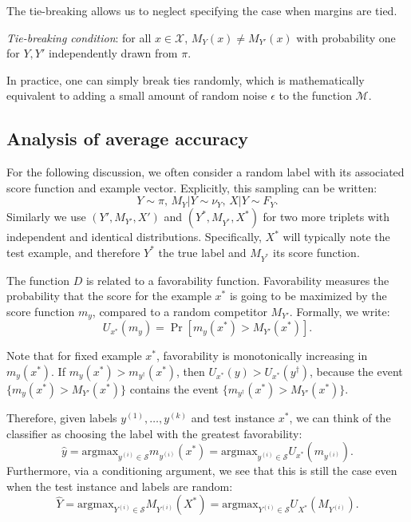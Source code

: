 \documentclass[twoside,11pt]{article}
\newcommand{\argmax}{\text{argmax}}
\begin{document}
The tie-breaking allows us
to neglect specifying the case when
margins are tied.
\begin{definition}
\emph{Tie-breaking condition}: for all $x \in \mathcal{X}$,
$M_Y(x) \neq M_{Y'}(x)$
with probability one for $Y, Y'$ independently drawn from $\pi$.
\end{definition}
In practice, one can simply break ties randomly,
which is mathematically equivalent to adding a small amount of random
noise $\epsilon$ to the function $\mathcal{M}$.

\subsection{Analysis of average accuracy}

For the following discussion, we often consider a random label with
its associated score function and example vector. Explicitly, this
sampling can be written:
\[Y \sim \pi,\, M_{Y}|Y \sim \nu_{Y},\, X|Y \sim F_{Y}. \]
Similarly we use $(Y',M_{Y'},X')$ and $(Y^*,M_{Y^*},X^*)$ for two more
triplets with independent and identical distributions. Specifically,
$X^*$ will typically note the test example, and therefore $Y^*$ the
true label and $M_{Y^*}$ its score function.

The function ${D}$ is related to a favorability
function. Favorability measures the probability that the score for the
example $x^*$ is going to be maximized by the score function $m_y$,
compared to a random competitor $M_{Y'}$.  Formally, we write:
\begin{equation}\label{eq:U_function}
U_{x^*}(m_{y}) = \Pr[m_{y}(x^*) > M_{Y'}(x^*)].
\end{equation}

Note that for fixed example $x^*$, favorability is monotonically
increasing in $m_{y}(x^*)$.  If $m_y(x^*) > m_{y^\dagger}(x^*)$, then
$U_{x^*}(y) > U_{x^*}(y^\dagger)$, because the event $\{m_{y}(x^*) >
M_{Y'}(x^*)\}$ contains the event $\{m_{y^\dagger}(x^*) >
M_{Y'}(x^*)\}$.

Therefore, given labels $y^{(1)},\hdots,y^{(k)}$ and test instance
$x^*$, we can think of the classifier as choosing the label with the
greatest favorability:
\[
\hat{y} = \argmax_{y^{(i)} \in \mathcal{S}} m_{y^{(i)}}(x^*) = \argmax_{y^{(i)} \in \mathcal{S}} U_{x^*}(m_{y^{(i)}}).
\]
Furthermore, via a conditioning argument, we see that this is still
the case even when the test instance and labels are random:
\[
\hat{Y} = \argmax_{Y^{(i)} \in \mathcal{S}} M_{Y^{(i)}}(X^*) = \argmax_{Y^{(i)} \in \mathcal{S}} U_{X^*}(M_{Y^{(i)}}).
\]
\end{document}
